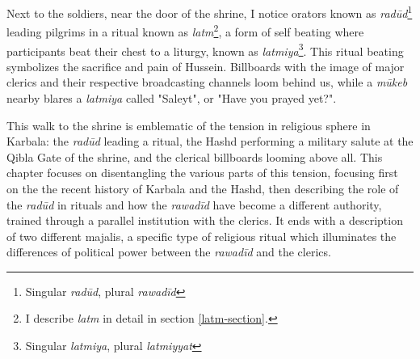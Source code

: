Next to the soldiers, near the door of the shrine, I notice orators known as \emph{radūd}\footnote{Singular \emph{radūd}, plural \emph{rawadīd}} leading pilgrims in a ritual known as \emph{latm}\footnote{I describe \emph{latm} in detail in section \ref{latm-section}.}, a form of self beating where participants beat their chest to a liturgy, known as \emph{latmiya}\footnote{Singular \emph{latmiya}, plural \emph{latmiyyat}}. This ritual beating symbolizes the sacrifice and pain of Hussein. Billboards with the image of major clerics and their respective broadcasting channels loom behind us, while a \emph{mūkeb} nearby blares a \emph{latmiya} called "Saleyt", or "Have you prayed yet?". 


This walk to the shrine is emblematic of the tension in religious sphere in Karbala: the \emph{radūd} leading a ritual, the Hashd performing a military salute at the Qibla Gate of the shrine, and the clerical billboards looming above all. This chapter focuses on disentangling the various parts of this tension, focusing first on the the recent history of Karbala and the Hashd, then describing the role of the \emph{radūd} in rituals and how the \emph{rawadīd} have become a different authority, trained through a parallel institution with the clerics. It ends with a description of two different majalis, a specific type of religious ritual which illuminates the differences of political power between the \emph{rawadīd} and the clerics. 





